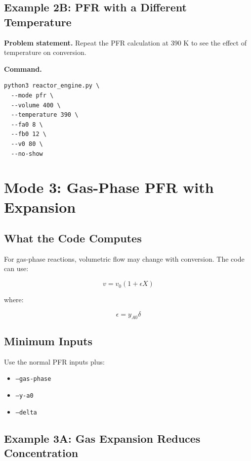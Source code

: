 \documentclass[11pt]{article}
\begin{document}
\subsection{Example 2B: PFR with a Different Temperature}

\textbf{Problem statement.} Repeat the PFR calculation at 390 K to see the effect of temperature on conversion.

\textbf{Command.}

\begin{lstlisting}
python3 reactor_engine.py \
  --mode pfr \
  --volume 400 \
  --temperature 390 \
  --fa0 8 \
  --fb0 12 \
  --v0 80 \
  --no-show
\end{lstlisting}

\section{Mode 3: Gas-Phase PFR with Expansion}

\subsection{What the Code Computes}

For gas-phase reactions, volumetric flow may change with conversion. The code can use:

\begin{equation}
v = v_0(1+\epsilon X)
\end{equation}

where:

\begin{equation}
\epsilon = y_{A0}\delta
\end{equation}

\subsection{Minimum Inputs}

Use the normal PFR inputs plus:

\begin{itemize}
    \item \texttt{--gas-phase}
    \item \texttt{--y-a0}
    \item \texttt{--delta}
\end{itemize}

\subsection{Example 3A: Gas Expansion Reduces Concentration}
\end{document}
